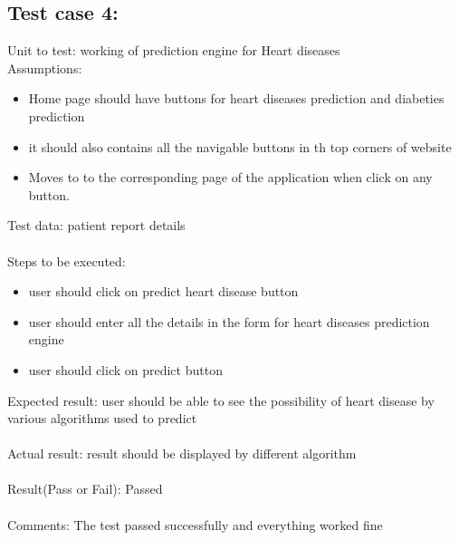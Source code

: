 \documentclass[oneside,12pt]{Classes/VTU}
\begin{document}
	\subsection{Test case 4:}
	Unit to test: working of prediction engine for Heart diseases \\
	Assumptions:\\
	\begin{itemize}
		\item Home page should have buttons for heart diseases prediction and diabeties prediction
		\item it should also contains all the navigable buttons in th top corners of website
		\item Moves to to the corresponding page of the application when click on any button.
	\end{itemize}
	Test data: patient report details\\
	\\
	Steps to be executed:\\
	\begin{itemize}
		\item user should click on predict heart disease button
		\item user should enter all the details in the form for heart diseases prediction engine
		\item user should click on predict button
	\end{itemize}
	Expected result:  user should be able to see the possibility of heart disease by various algorithms used to predict\\
	\\
	Actual result: result should be displayed by different algorithm\\
	\\
	Result(Pass or Fail): Passed\\
	\\
	Comments: The test passed successfully and everything worked fine
	
\end{document}
